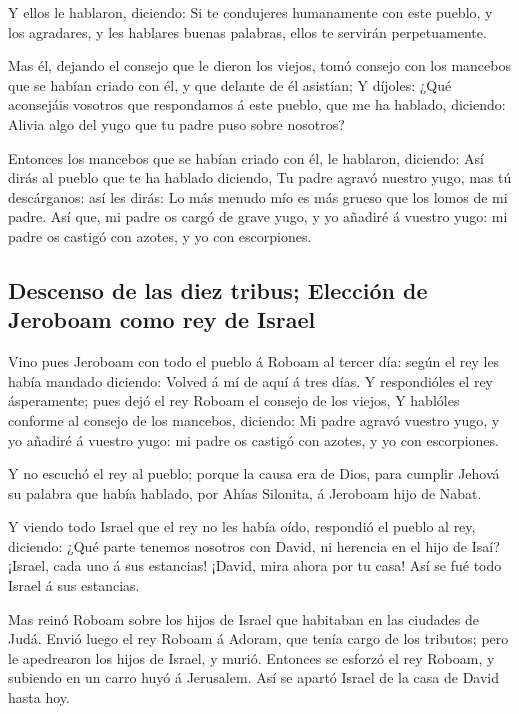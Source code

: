  Y ellos le hablaron, diciendo: Si te condujeres humanamente
con este pueblo, y los agradares, y les hablares buenas palabras, ellos
te servirán perpetuamente.

 Mas él, dejando el consejo que le dieron los viejos, tomó
consejo con los mancebos que se habían criado con él, y que delante de
él asistían;  Y díjoles: ¿Qué aconsejáis vosotros que
respondamos á este pueblo, que me ha hablado, diciendo: Alivia algo del
yugo que tu padre puso sobre nosotros?

 Entonces los mancebos que se habían criado con él, le
hablaron, diciendo: Así dirás al pueblo que te ha hablado diciendo, Tu
padre agravó nuestro yugo, mas tú descárganos: así les dirás: Lo más
menudo mío es más grueso que los lomos de mi padre.  Así
que, mi padre os cargó de grave yugo, y yo añadiré á vuestro yugo: mi
padre os castigó con azotes, y yo con escorpiones.

\hypertarget{descenso-de-las-diez-tribus-elecciuxf3n-de-jeroboam-como-rey-de-israel}{%
\subsection{Descenso de las diez tribus; Elección de Jeroboam como rey
de
Israel}\label{descenso-de-las-diez-tribus-elecciuxf3n-de-jeroboam-como-rey-de-israel}}

 Vino pues Jeroboam con todo el pueblo á Roboam al tercer
día: según el rey les había mandado diciendo: Volved á mí de aquí á tres
días.  Y respondióles el rey ásperamente; pues dejó el rey
Roboam el consejo de los viejos,  Y hablóles conforme al
consejo de los mancebos, diciendo: Mi padre agravó vuestro yugo, y yo
añadiré á vuestro yugo: mi padre os castigó con azotes, y yo con
escorpiones.

 Y no escuchó el rey al pueblo; porque la causa era de
Dios, para cumplir Jehová su palabra que había hablado, por Ahías
Silonita, á Jeroboam hijo de Nabat.

 Y viendo todo Israel que el rey no les había oído,
respondió el pueblo al rey, diciendo: ¿Qué parte tenemos nosotros con
David, ni herencia en el hijo de Isaí? ¡Israel, cada uno á sus
estancias! ¡David, mira ahora por tu casa! Así se fué todo Israel á sus
estancias.

 Mas reinó Roboam sobre los hijos de Israel que habitaban
en las ciudades de Judá.  Envió luego el rey Roboam á
Adoram, que tenía cargo de los tributos; pero le apedrearon los hijos de
Israel, y murió. Entonces se esforzó el rey Roboam, y subiendo en un
carro huyó á Jerusalem.  Así se apartó Israel de la casa de
David hasta hoy.

